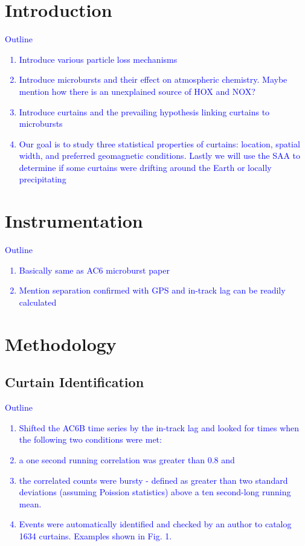 \documentclass[draft]{agujournal2019}
\begin{document}
\section{Introduction}
\textcolor{blue}{
Outline
\begin{enumerate}
\item Introduce various particle loss mechanisms
\item Introduce microbursts and their effect on atmospheric chemistry. Maybe mention how there is an unexplained source of HOX and NOX?
\item Introduce curtains and the prevailing hypothesis linking curtains to microbursts
\item Our goal is to study three statistical properties of curtains: location, spatial width, and preferred geomagnetic conditions. Lastly we will use the SAA to determine if some curtains were drifting around the Earth or locally precipitating
\end{enumerate}
}

\section{Instrumentation} \label{instrumentation}
\textcolor{blue}{
Outline
\begin{enumerate}
\item Basically same as AC6 microburst paper
\item Mention separation confirmed with GPS and in-track lag can be readily calculated
\end{enumerate}
}

\section{Methodology} 
\subsection{Curtain Identification} \label{curtain_identification}
\textcolor{blue}{
Outline
\begin{enumerate}
\item Shifted the AC6B time series by the in-track lag and looked for times when the following two conditions were met:
\item a one second running correlation was greater than 0.8 and
\item the correlated counts were bursty - defined as greater than two standard deviations (assuming Poission statistics) above a ten second-long running mean.
\item Events were automatically identified and checked by an author to catalog 1634 curtains. Examples shown in Fig. 1.
\end{enumerate}
}
\end{document}
